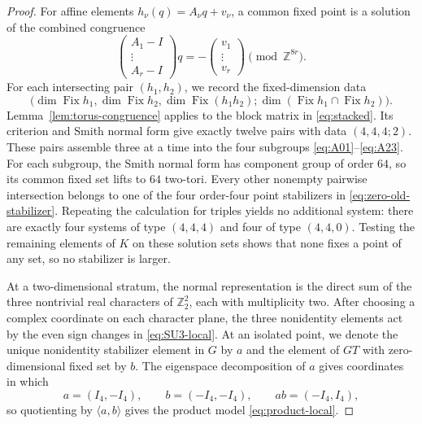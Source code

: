 \documentclass[11pt]{article}
\theoremstyle{remark}\newtheorem{remark}[theorem]{Remark}
\newcommand{\Fix}{\operatorname{Fix}}
\newcommand{\Z}{\mathbb Z}
\begin{document}
\begin{proof}
For affine elements $h_\nu(q)=A_\nu q+v_\nu$, a common fixed point is a
solution of the combined congruence
\begin{equation}\label{eq:stacked}
\begin{pmatrix}A_1-I\\\vdots\\A_r-I\end{pmatrix}q
=-\begin{pmatrix}v_1\\\vdots\\v_r\end{pmatrix}\pmod{\Z^{8r}}.
\end{equation}
For each intersecting pair $(h_1,h_2)$, we record the fixed-dimension data
\[
\bigl(\dim\Fix h_1,\dim\Fix h_2,\dim\Fix(h_1h_2);
      \dim(\Fix h_1\cap\Fix h_2)\bigr).
\]
Lemma~\ref{lem:torus-congruence} applies to the block matrix in
\eqref{eq:stacked}.  Its criterion and Smith normal form give
exactly twelve pairs with data $(4,4,4;2)$.  These pairs assemble three at
a time into the four subgroups \eqref{eq:A01}--\eqref{eq:A23}.  For each
subgroup, the Smith normal form has component group of order $64$, so its
common fixed set lifts to $64$ two-tori.  Every other nonempty pairwise
intersection belongs to one of the four order-four point stabilizers in
\eqref{eq:zero-old-stabilizer}.  Repeating the calculation for triples
yields no additional system: there are exactly four systems of type
$(4,4,4)$ and four of type $(4,4,0)$.  Testing the remaining elements of
$K$ on these solution sets shows that none fixes a point of any set, so no
stabilizer is larger.

At a two-dimensional stratum, the normal representation is the direct sum
of the three nontrivial real characters of $\Z_2^2$, each with multiplicity
two.  After choosing a complex coordinate on each character plane, the
three nonidentity elements act by the even sign changes in
\eqref{eq:SU3-local}.  At an isolated point, we denote the unique
nonidentity stabilizer element in $G$ by $a$ and the element of $GT$ with
zero-dimensional fixed set by $b$.  The eigenspace decomposition of $a$
gives coordinates in which
\[
a=(I_4,-I_4),\qquad b=(-I_4,-I_4),\qquad ab=(-I_4,I_4),
\]
so quotienting by $\langle a,b\rangle$ gives the product model
\eqref{eq:product-local}.
\end{proof}
\end{document}

